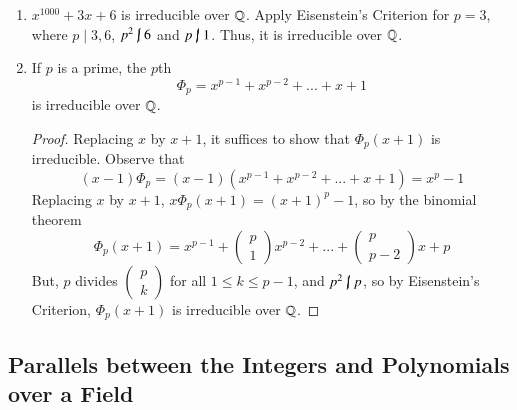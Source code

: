 \documentclass[12pt, a4paper, oneside, openright, titlepage]{book}
\begin{document}
\begin{eg}
    \leavevmode
    \begin{enumerate}
        \item $x^{1000}+3x+6$ is irreducible over $\mathbb Q$. Apply Eisenstein's Criterion for $p = 3$, where $p\;\vert\;3,6$, $p^2\;\cancel{\vert}\;6$ and $p\;\cancel{\vert}\;1$. Thus, it is irreducible over $\mathbb Q$.
        \item If $p$ is a prime, the $p$th  \begin{equation}
            \Phi_p = x^{p-1}+x^{p-2}+...+x+1
        \end{equation}
        is irreducible over $\mathbb Q$.
        \begin{proof}
            Replacing $x$ by $x+1$, it suffices to show that $\Phi_p(x+1)$ is irreducible. Observe that $$(x-1)\Phi_p = (x-1)(x^{p-1}+x^{p-2}+...+x+1) = x^p - 1$$
            Replacing $x$ by $x+1$, $x\Phi_p(x+1) = (x+1)^p-1$, so by the binomial theorem $$\Phi_p(x+1) = x^{p-1} + \begin{pmatrix}p \\ 1 \end{pmatrix}x^{p-2} + ... + \begin{pmatrix}p \\ p-2 \end{pmatrix}x + p$$
            But, $p$ divides $\begin{pmatrix}p \\ k \end{pmatrix}$ for all $1 \leq k \leq p-1$, and $p^2\;\cancel{\vert}\;p$, so by Eisenstein's Criterion, $\Phi_p(x+1)$ is irreducible over $\mathbb Q$.
        \end{proof}
    \end{enumerate}
\end{eg}


\subsection{\textsection Parallels between the Integers and Polynomials over a Field}
\end{document}
